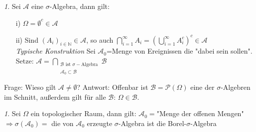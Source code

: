 \documentclass[10pt,a4paper]{report}
\numberwithin{equation}{section}
\numberwithin{figure}{section}
\theoremstyle{plain}
\theoremstyle{definition}
\theoremstyle{remark}
\newtheorem{rem}[thm]{\protect\remarkname}
\theoremstyle{plain}
\providecommand{\remarkname}{Bemerkung}
\newcommand{\1}{ \mathbb{1} } %
\begin{document}
\begin{rem}
  Sei $\mathcal{A}$ eine $\sigma$-Algebra, dann gilt:
  \begin{itemize}
  \item[i)] $\Omega=\emptyset^c \in \mathcal{A}$
  \item[ii)] Sind $(A_i)_{i \in \mathbb{N}} \in \mathcal{A}$, so auch $\bigcap\limits_{i=1}^\infty A_i=\left(\bigcup\limits_{i=1}^\infty A_i^c\right)^c \in \mathcal{A}$\\
    \textit{Typische Konstruktion} Sei $\mathcal{A}_0$=Menge von
    Ereignissen die "dabei sein sollen". Setze:
    $\mathcal{A}=\bigcap\limits_{\substack{\mathcal{B} \text{ ist }
        \sigma-\text{Algebra}\\ \mathcal{A}_0\subset
        \mathcal{B}}}\mathcal{B}$
  \end{itemize}

\end{rem}
Frage: Wieso gilt $\mathcal{A}\neq \emptyset$? Antwort: Offenbar ist $\mathcal{B}=\mathcal{P}(\Omega)$ eine der $\sigma$-Algebren im Schnitt, außerdem gilt für alle $\mathcal{B}$: $\Omega \in \mathcal{B}$.
\begin{rem} 
  Sei $\Omega$ ein topologischer Raum, dann gilt:
  $\mathcal{A}_0=$"Menge der offenen Mengen"
  $\Rightarrow \sigma(\mathcal{A}_0)=$ die von $\mathcal{A}_0$ erzeugte $\sigma$-Algebra ist die Borel-$\sigma$-Algebra
\end{rem}

\end{document}
